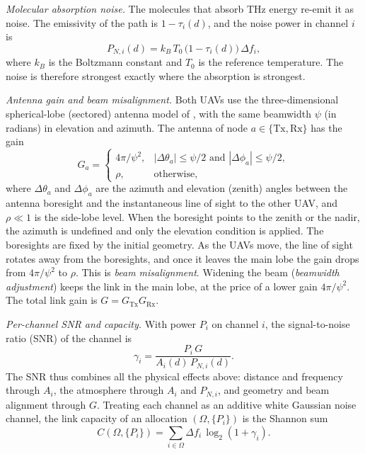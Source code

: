 \documentclass[correspondence]{IEEEtaes}
\begin{document}
\emph{Molecular absorption noise.} The molecules that absorb THz energy re-emit it as
noise. The emissivity of the path is $1-\tau_i(d)$, and the noise power in channel $i$ is
\cite{jornet2011channel}
\begin{equation}
P_{N,i}(d)=k_B\,T_0\,\big(1-\tau_i(d)\big)\,\Delta f_i ,
\label{eq:noise}
\end{equation}
where $k_B$ is the Boltzmann constant and $T_0$ is the reference temperature. The noise is
therefore strongest exactly where the absorption is strongest.

\emph{Antenna gain and beam misalignment.} Both UAVs use the three-dimensional
spherical-lobe (sectored) antenna model of \cite{saeed2024maxactive}, with the same
beamwidth $\psi$ (in radians) in elevation and azimuth. The antenna of node
$a\in\{\mathrm{Tx},\mathrm{Rx}\}$ has the gain
\begin{equation}
G_a=\begin{cases}
4\pi/\psi^{2}, & |\Delta\theta_a|\le\psi/2 \text{ and } |\Delta\phi_a|\le\psi/2,\\
\rho, & \text{otherwise},
\end{cases}
\label{eq:gain}
\end{equation}
where $\Delta\theta_a$ and $\Delta\phi_a$ are the azimuth and elevation (zenith) angles
between the antenna boresight and the instantaneous line of sight to the other UAV, and
$\rho\ll1$ is the side-lobe level. When the boresight points to the zenith or the nadir,
the azimuth is undefined and only the elevation condition is applied. The boresights are fixed by the initial geometry. As the UAVs move,
the line of sight rotates away from the boresights, and once it leaves the main lobe the
gain drops from $4\pi/\psi^2$ to $\rho$. This is \emph{beam misalignment}. Widening the
beam (\emph{beamwidth adjustment}) keeps the link in the main lobe, at the price of a
lower gain $4\pi/\psi^2$. The total link gain is $G=G_{\mathrm{Tx}}G_{\mathrm{Rx}}$.

\emph{Per-channel SNR and capacity.} With power $P_i$ on channel $i$, the signal-to-noise
ratio (SNR) of the channel is
\begin{equation}
\gamma_i=\frac{P_i\,G}{A_i(d)\,P_{N,i}(d)} .
\label{eq:snr}
\end{equation}
The SNR thus combines all the physical effects above: distance and frequency through
$A_i$, the atmosphere through $A_i$ and $P_{N,i}$, and geometry and beam alignment through
$G$. Treating each channel as an additive white Gaussian noise channel, the link capacity
of an allocation $(\Omega,\{P_i\})$ is the Shannon sum
\begin{equation}
C(\Omega,\{P_i\})=\sum_{i\in\Omega}\Delta f_i\,\log_2\!\left(1+\gamma_i\right).
\label{eq:capacity}
\end{equation}
\end{document}
